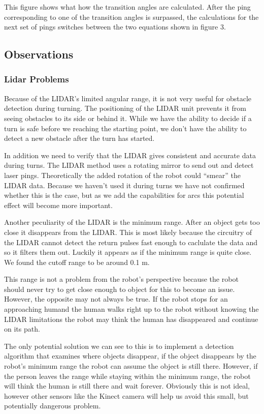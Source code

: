 This figure shows what how the transition angles are calculated.
After the ping corresponding to one of the transition angles is surpassed,
the calculations for the next set of pings switches between the two
equations shown in figure 3.

\subsection{Observations}

\subsubsection{Lidar Problems}
Because of the LIDAR's limited angular range, it is not very useful
for obstacle detection during turning.  The positioning of the LIDAR
unit prevents it from seeing obstacles to its side or behind it. While
we have the ability to decide if a turn is safe before we reaching the
starting point, we don't
have the ability to detect a new obstacle after the turn has started.

In addition we need to verify that the LIDAR gives consistent and
accurate data during turns.  The LIDAR method uses a rotating mirror
to send out and detect laser pings.\cite{deyle_sick_2008}
Theoretically the added rotation of the robot could ``smear'' the
LIDAR data.  Because we haven't used it during turns we have not
confirmed whether this is the case, but as we add the capabilities for
arcs this potential effect will become more important.

Another peculiarity of the LIDAR is the minimum range.  After an
object gets too close it disappears from the LIDAR.  This is most
likely because the circuitry of the LIDAR cannot detect the return
pulses fast enough to caclulate the data and so it filters them out.
Luckily it appears as if the minimum range is quite close. We found
the cutoff range to be around 0.1 m.

This range is not a problem from the robot's perspective because the
robot should never try to get close enough to object for this to
become an issue.  However, the opposite may not always be true. If the
robot stops for an approaching humand the human walks right up to the
robot without knowing the LIDAR limitations the robot may think the
human has disappeared and continue on its path.

The only potential solution we can see to this is to implement a
detection algorithm that examines where objects disappear, if the
object disappears by the robot's minimum range the robot can assume
the object is still there.  However, if the person leaves the range
while staying within the minimum range, the robot will think the human
is still there and wait forever. Obviously this is not ideal, however
other sensors like the Kinect camera will help us avoid this small, but potentially dangerous problem.


